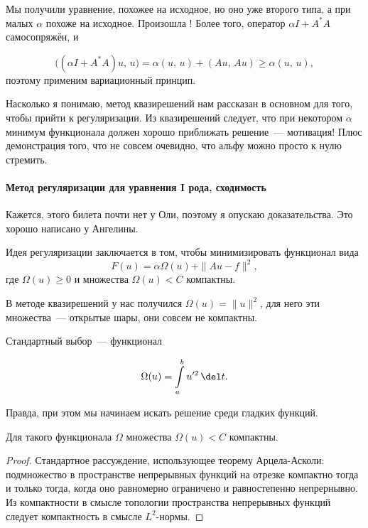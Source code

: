 \documentclass{trlnotes}
\begin{document}
    Мы получили уравнение, похожее на исходное, но оно уже второго типа, а при малых $\alpha$ похоже на исходное. Произошла ! Более того, оператор $\alpha I + A^*A$ самосопряжён, и

    \[
        \big((\alpha I + A^*A)u, \, u\big) = \alpha(u, \, u) + (Au, \, Au) \geqslant \alpha(u, \, u),
    \]
    поэтому применим вариационный принцип.

    \begin{rem}
        Насколько я понимаю, метод квазирешений нам рассказан в основном для того, чтобы прийти к регуляризации. Из квазирешений следует, что при некотором $\alpha$ минимум функционала должен хорошо приближать решение~--- мотивация! Плюс демонстрация того, что не совсем очевидно, что альфу можно просто к нулю стремить.
    \end{rem}


\paragraph{Метод регуляризации для уравнения I рода, сходимость}

    \begin{rem}
        Кажется, этого билета почти нет у Оли, поэтому я опускаю доказательства. Это хорошо написано у Ангелины.
    \end{rem}

    Идея регуляризации заключается в том, чтобы минимизировать функционал вида
    \[
        F(u) = \alpha \Omega(u) + \|Au - f\|^2,
    \]
    где $\Omega(u) \geqslant 0$ и множества $\Omega(u) < C$ компактны.

    \begin{rem}
        В методе квазирешений у нас получился $\Omega(u) = \|u\|^2$, для него эти множества~--- открытые шары, они совсем не компактны.
    \end{rem}

    Стандартный выбор~--- функционал

    \[
        \Omega(u) = \int\limits_a^b u'^2 \, \del t.
    \]

    Правда, при этом мы начинаем искать решение среди гладких функций.

    \begin{st}
        Для такого функционала $\Omega$ множества $\Omega(u) < C$ компактны.
        \begin{proof}
            Стандартное рассуждение, использующее теорему Арцела-Асколи: подмножество в пространстве непрерывных функций на отрезке компактно тогда и только тогда, когда оно равномерно ограничено и равностепенно непрернывно. Из компактности в смысле топологии пространства непрерывных функций следует компактность в смысле $L^2$-нормы.
        \end{proof}
    \end{st}
\end{document}
